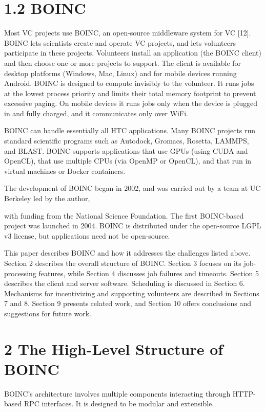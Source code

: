 \documentclass[
]{article}
\begin{document}
\section{1.2 BOINC}\label{boinc}

Most VC projects use BOINC, an open-source middleware system for VC
{[}12{]}. BOINC lets scientists create and operate VC projects, and lets
volunteers participate in these projects. Volunteers install an
application (the BOINC client) and then choose one or more projects to
support. The client is available for desktop platforms (Windows, Mac,
Linux) and for mobile devices running Android. BOINC is designed to
compute invisibly to the volunteer. It runs jobs at the lowest process
priority and limits their total memory footprint to prevent excessive
paging. On mobile devices it runs jobs only when the device is plugged
in and fully charged, and it communicates only over WiFi.

BOINC can handle essentially all HTC applications. Many BOINC projects
run standard scientific programs such as Autodock, Gromacs, Rosetta,
LAMMPS, and BLAST. BOINC supports applications that use GPUs (using CUDA
and OpenCL), that use multiple CPUs (via OpenMP or OpenCL), and that run
in virtual machines or Docker containers.

The development of BOINC began in 2002, and was carried out by a team at
UC Berkeley led by the author,

with funding from the National Science Foundation. The first BOINC-based
project was launched in 2004. BOINC is distributed under the open-source
LGPL v3 license, but applications need not be open-source.

This paper describes BOINC and how it addresses the challenges listed
above. Section 2 describes the overall structure of BOINC. Section 3
focuses on its job-processing features, while Section 4 discusses job
failures and timeouts. Section 5 describes the client and server
software. Scheduling is discussed in Section 6. Mechanisms for
incentivizing and supporting volunteers are described in Sections 7 and
8. Section 9 presents related work, and Section 10 offers conclusions
and suggestions for future work.

\section{2 The High-Level Structure of
BOINC}\label{the-high-level-structure-of-boinc}

BOINC's architecture involves multiple components interacting through
HTTP-based RPC interfaces. It is designed to be modular and extensible.
\end{document}
